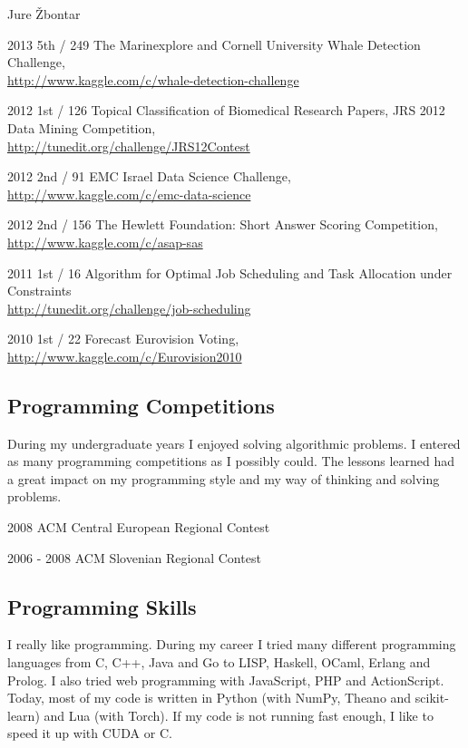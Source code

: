 \documentclass[12pt,a4paper]{article}
\begin{document}
\begin{cv}{Jure \v{Z}bontar}
\begin{cvlist}{}
\item[2013 \quad 5th / 249] The Marinexplore and Cornell University Whale Detection 
Challenge\footnotemark[1], \\
\url{http://www.kaggle.com/c/whale-detection-challenge}
\item[2012 \quad 1st / 126] Topical Classification of Biomedical Research Papers, 
JRS 2012 Data Mining Competition\footnotemark[2], \\
\url{http://tunedit.org/challenge/JRS12Contest}
\item[2012 \quad 2nd / 91] EMC Israel Data Science Challenge\footnotemark[2], \\
\url{http://www.kaggle.com/c/emc-data-science}
\item[2012 \quad 2nd / 156] The Hewlett Foundation: Short Answer Scoring 
Competition\footnotemark[1], \\
\url{http://www.kaggle.com/c/asap-sas}
\item[2011 \quad 1st / 16] Algorithm for Optimal Job Scheduling and Task 
Allocation under Constraints\footnotemark[1] \\
\url{http://tunedit.org/challenge/job-scheduling}
\item[2010 \quad 1st / 22] Forecast Eurovision Voting\footnotemark[1], \\
\url{http://www.kaggle.com/c/Eurovision2010}
\end{cvlist}

 
\subsection*{Programming Competitions}
During my undergraduate years I enjoyed solving algorithmic problems. I entered
as many programming competitions as I possibly could. The lessons learned
had a great impact on my programming style and my way of thinking and solving problems.

\begin{cvlist}{}
\item[2008] ACM Central European Regional Contest
\item[2006 - 2008] ACM Slovenian Regional Contest
\end{cvlist}

\subsection*{Programming Skills}
I really like programming. During my career I tried many different
programming languages from C, C++, Java and Go to LISP, Haskell, OCaml,
Erlang and Prolog. I also tried web programming with JavaScript, PHP and
ActionScript. Today, most of my code is written in Python (with NumPy,
Theano and scikit-learn) and Lua (with Torch). If my code is not running fast enough,
I like to speed it up with CUDA or C.

\end{cv}
\end{document}
